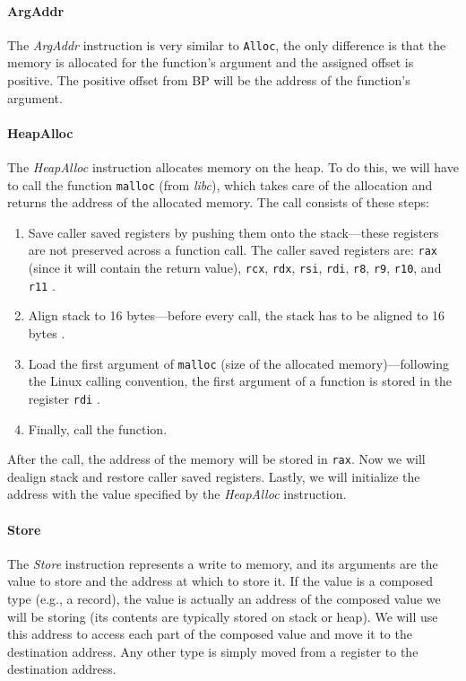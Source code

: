 \documentclass[thesis=M,english]{FITthesis}[2019/12/23]
\begin{document}
\paragraph*{ArgAddr} The \emph{ArgAddr} instruction is very similar to \texttt{Alloc}, the only difference is that the memory is allocated for the function's argument and the assigned offset is positive. The positive offset from BP will be the address of the function's argument.

\paragraph*{HeapAlloc} The \emph{HeapAlloc} instruction allocates memory on the heap. To do this, we will have to call the function \texttt{malloc} (from \emph{libc}), which takes care of the allocation and returns the address of the allocated memory. The call consists of these steps:
\begin{enumerate}
    \item Save caller saved registers by pushing them onto the stack---these registers are not preserved across a function call. The caller saved registers are: \texttt{rax} (since it will contain the return value), \texttt{rcx}, \texttt{rdx}, \texttt{rsi}, \texttt{rdi}, \texttt{r8}, \texttt{r9}, \texttt{r10}, and \texttt{r11} \cite[Chap. 12.8.3]{x86_assembly}.
    \item Align stack to 16 bytes---before every call, the stack has to be aligned to 16 bytes \cite[Chap 6.2.2]{intel_x86}.
    \item Load the first argument of \texttt{malloc} (size of the allocated memory)---following the Linux calling convention, the first argument of a function is stored in the register \texttt{rdi} \cite[12.8.1]{x86_assembly}.
    \item Finally, call the function.
\end{enumerate}
After the call, the address of the memory will be stored in \texttt{rax}. Now we will dealign stack and restore caller saved registers. Lastly, we will initialize the address with the value specified by the \emph{HeapAlloc} instruction.

\paragraph*{Store} The \emph{Store} instruction represents a write to memory, and its arguments are the value to store and the address at which to store it. If the value is a composed type (e.g., a record), the value is actually an address of the composed value we will be storing (its contents are typically stored on stack or heap). We will use this address to access each part of the composed value and move it to the destination address. Any other type is simply moved from a register to the destination address.
\end{document}
